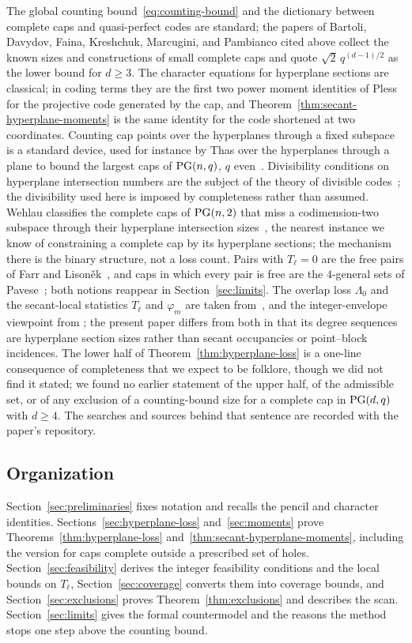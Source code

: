 The global counting bound~\eqref{eq:counting-bound} and the dictionary
between complete caps and quasi-perfect codes are standard; the papers of
Bartoli, Davydov, Faina, Kreshchuk, Marcugini, and Pambianco cited above
collect the known sizes and constructions of small complete caps and
quote \(\sqrt2\,q^{(d-1)/2}\) as the lower bound for \(d\ge3\).  The
character equations for hyperplane sections are classical; in coding
terms they are the first two power moment identities of
Pless~\cite{Pless1963} for the projective code generated by the cap, and
Theorem~\ref{thm:secant-hyperplane-moments} is the same identity for the
code shortened at two coordinates.  Counting cap points over the
hyperplanes through a fixed subspace is a standard device, used for
instance by Thas over the hyperplanes through a plane to bound the
largest caps of \(\mathrm{PG}(n,q)\), \(q\) even~\cite{Thas2017}.  Divisibility
conditions on hyperplane intersection numbers are the subject of the
theory of divisible codes~\cite{Kurz2021}; the divisibility used here is
imposed by completeness rather than assumed.  Wehlau classifies the
complete caps of \(\mathrm{PG}(n,2)\) that miss a codimension-two subspace
through their hyperplane intersection sizes~\cite{Wehlau2004}, the
nearest instance we know of constraining a complete cap by its hyperplane
sections; the mechanism there is the binary structure, not a loss count.
Pairs with \(T_\ell=0\) are the free pairs of Farr and
Lison\v{e}k~\cite{FarrLisonek2006a,FarrLisonek2006}, and caps in which
every pair is free are the \(4\)-general sets of
Pavese~\cite{Pavese2025}; both notions reappear in
Section~\ref{sec:limits}.  The overlap loss \(\Lambda_0\) and the
secant-local statistics \(T_\ell\) and \(\varphi_m\) are taken
from~\cite{RuddSecantDefects}, and the integer-envelope viewpoint from
\cite{RuddIntegralSecant}; the present paper differs from both in that its
degree sequences are hyperplane section sizes rather than secant
occupancies or point--block incidences.  The lower half of
Theorem~\ref{thm:hyperplane-loss} is a one-line consequence of
completeness that we expect to be folklore, though we did not find it
stated; we found no earlier statement of the upper half, of the
admissible set, or of any exclusion of a counting-bound size for a
complete cap in \(\mathrm{PG}(d,q)\) with \(d\ge4\).  The searches and sources
behind that sentence are recorded with the paper's repository.

\subsection*{Organization}

Section~\ref{sec:preliminaries} fixes notation and recalls the pencil and
character identities.  Sections~\ref{sec:hyperplane-loss}
and~\ref{sec:moments} prove Theorems~\ref{thm:hyperplane-loss}
and~\ref{thm:secant-hyperplane-moments}, including the version for caps
complete outside a prescribed set of holes.
Section~\ref{sec:feasibility} derives the integer feasibility conditions
and the local bounds on \(T_\ell\), Section~\ref{sec:coverage} converts
them into coverage bounds, and Section~\ref{sec:exclusions} proves
Theorem~\ref{thm:exclusions} and describes the scan.
Section~\ref{sec:limits} gives the formal countermodel and the reasons the
method stops one step above the counting bound.
